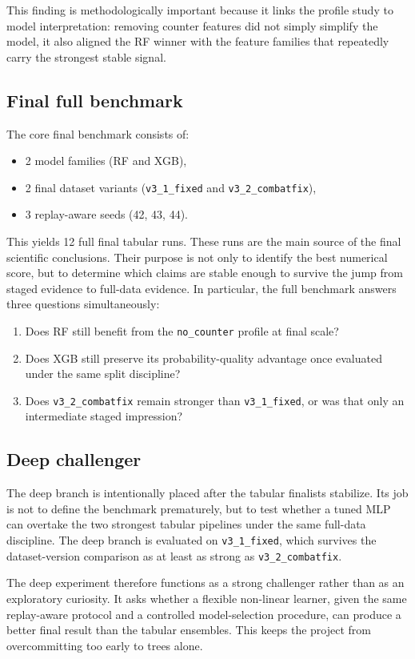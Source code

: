 \documentclass[11pt,a4paper]{article}
\begin{document}
This finding is methodologically important because it links the profile study to model interpretation: removing counter features did not simply simplify the model, it also aligned the RF winner with the feature families that repeatedly carry the strongest stable signal.

\subsection{Final full benchmark}
The core final benchmark consists of:
\begin{itemize}
    \item 2 model families (RF and XGB),
    \item 2 final dataset variants (\texttt{v3\_1\_fixed} and \texttt{v3\_2\_combatfix}),
    \item 3 replay-aware seeds (42, 43, 44).
\end{itemize}

This yields 12 full final tabular runs. These runs are the main source of the final scientific conclusions. Their purpose is not only to identify the best numerical score, but to determine which claims are stable enough to survive the jump from staged evidence to full-data evidence. In particular, the full benchmark answers three questions simultaneously:
\begin{enumerate}
    \item Does RF still benefit from the \texttt{no\_counter} profile at final scale?
    \item Does XGB still preserve its probability-quality advantage once evaluated under the same split discipline?
    \item Does \texttt{v3\_2\_combatfix} remain stronger than \texttt{v3\_1\_fixed}, or was that only an intermediate staged impression?
\end{enumerate}

\subsection{Deep challenger}
The deep branch is intentionally placed after the tabular finalists stabilize. Its job is not to define the benchmark prematurely, but to test whether a tuned MLP can overtake the two strongest tabular pipelines under the same full-data discipline. The deep branch is evaluated on \texttt{v3\_1\_fixed}, which survives the dataset-version comparison as at least as strong as \texttt{v3\_2\_combatfix}.

The deep experiment therefore functions as a strong challenger rather than as an exploratory curiosity. It asks whether a flexible non-linear learner, given the same replay-aware protocol and a controlled model-selection procedure, can produce a better final result than the tabular ensembles. This keeps the project from overcommitting too early to trees alone.
\end{document}
